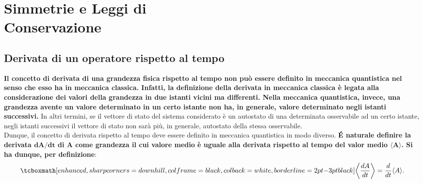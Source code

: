 \documentclass[a4paper,12pt,oneside]{book}
\newcommand*{\myfont}{\fontfamily{ppl}\selectfont}
\begin{document}
\fancypagestyle{plain}{%
\fancyhf{} %
\fancyfoot[C]{\bfseries \myfont{\thepage}} %
\renewcommand{\headrulewidth}{0pt}
\renewcommand{\footrulewidth}{0pt}}

\fancypagestyle{VS}{
\headheight = 15pt
\lhead[\myfont{\textit{\textbf{\thechapter\nouppercase{\leftmark}}}}]{\myfont{\textit{\textbf{\nouppercase{\leftmark}}}}}
\chead[]{}
\rhead[\myfont{\textbf{\thepage}}]{\myfont{\textbf{\thepage}}}

\lfoot[]{}
\cfoot[]{}
\rfoot[]{}
}



\pagestyle{VS}
\setcounter{chapter}{11}
\setcounter{page}{137}
\chapter[Simmetrie e Leggi di Conservazione]{Simmetrie e Leggi di\\ Conservazione} 
\section{Derivata di un operatore rispetto al tempo} 

\textbf{Il concetto di derivata di una grandezza fisica rispetto al tempo non può essere definito in meccanica quantistica nel senso che esso ha in meccanica classica. Infatti, la definizione della derivata in meccanica classica è legata alla considerazione dei valori della grandezza in due istanti vicini ma differenti. Nella meccanica quantistica, invece, una grandezza avente un valore determinato in un certo istante non ha, in generale, valore determinato negli istanti successivi.} In altri termini, se il vettore di stato del sistema considerato è un autostato di una determinata osservabile ad un certo istante, negli istanti successivi il vettore di stato non sarà più, in generale, autostato della stessa osservabile.\\

Dunque, il concetto di derivata rispetto al tempo deve essere definito in meccanica quantistica in modo diverso.
\textbf{\'E naturale definire la derivata $\mathbf{{dA}/{dt}}$ di A come grandezza il cui valore medio è uguale alla derivata rispetto al tempo del valor medio $\mathbf{\langle A \rangle} $.
Si ha dunque, per definizione}:
	\begin{equation}
		\tcboxmath[enhanced, sharp corners=downhill, colframe=black, colback=white, borderline={2pt}{-3pt}{black}]{
		\left\langle \frac{dA}{dt} \right\rangle = \frac{d}{dt} \langle A \rangle .
		}
	\end{equation}\\
\end{document}
